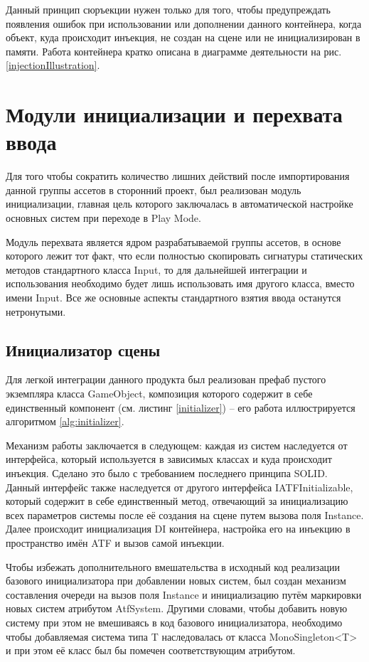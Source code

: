 Данный принцип сюръекции нужен только для того, чтобы предупреждать появления ошибок при использовании или дополнении данного контейнера, когда объект, куда происходит инъекция, не создан на сцене или не инициализирован в памяти. Работа контейнера кратко описана в диаграмме деятельности на рис. \ref{injectionIllustration}.

\section{Модули инициализации и перехвата ввода}
Для того чтобы сократить количество лишних действий после импортирования данной группы ассетов в сторонний проект, был реализован модуль инициализации, главная цель которого заключалась в автоматической настройке основных систем при переходе в Play Mode.

Модуль перехвата является ядром разрабатываемой группы ассетов, в основе которого лежит тот факт, что если полностью скопировать сигнатуры статических методов стандартного класса Input, то для дальнейшей интеграции и использования необходимо будет лишь использовать имя другого класса, вместо имени Input. Все же основные аспекты стандартного взятия ввода останутся нетронутыми.

\subsection{Инициализатор сцены}
Для легкой интеграции данного продукта был реализован префаб пустого экземпляра класса GameObject, композиция которого содержит в себе единственный компонент (см. листинг \ref{initializer}) -- его работа  иллюстрируется алгоритмом \ref{alg:initializer}.

Механизм работы заключается в следующем: каждая из систем наследуется от интерфейса, который используется в зависимых классах и куда происходит инъекция. Сделано это было с требованием последнего принципа SOLID. Данный интерфейс также наследуется от другого интерфейса IATFInitializable, который содержит в себе единственный метод, отвечающий за инициализацию всех параметров системы после её создания на сцене путем вызова поля Instance. Далее происходит инициализация DI контейнера, настройка его на инъекцию в пространство имён ATF и вызов самой инъекции.

Чтобы избежать дополнительного вмешательства в исходный код реализации базового инициализатора при добавлении новых систем, был создан механизм составления очереди на вызов поля Instance и инициализацию путём маркировки новых систем атрибутом AtfSystem. Другими словами, чтобы добавить новую систему при этом не вмешиваясь в код базового инициализатора, необходимо чтобы добавляемая система типа T наследовалась от класса MonoSingleton<T> и при этом её класс был бы помечен соответствующим атрибутом.

